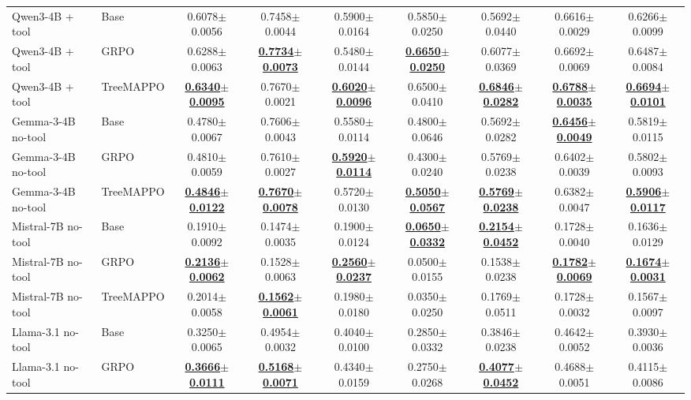 \documentclass{article}
\newcommand{\ours}{TreeMAPPO\xspace}
\newcommand{\best}[1]{\textbf{\underline{#1}}}
\newcommand{\acc}[2]{#1{\scriptsize$\pm$#2}}
\begin{document}
\begin{table}[t]
{\begin{tabular}{llccccccc}
\hline
Qwen3-4B + tool & Base & \acc{0.6078}{0.0056} & \acc{0.7458}{0.0044} & \acc{0.5900}{0.0164} & \acc{0.5850}{0.0250} & \acc{0.5692}{0.0440} & \acc{0.6616}{0.0029} & \acc{0.6266}{0.0099} \\
Qwen3-4B + tool & GRPO & \acc{0.6288}{0.0063} & \best{\acc{0.7734}{0.0073}} & \acc{0.5480}{0.0144} & \best{\acc{0.6650}{0.0250}} & \acc{0.6077}{0.0369} & \acc{0.6692}{0.0069} & \acc{0.6487}{0.0084} \\
Qwen3-4B + tool & \ours & \best{\acc{0.6340}{0.0095}} & \acc{0.7670}{0.0021} & \best{\acc{0.6020}{0.0096}} & \acc{0.6500}{0.0410} & \best{\acc{0.6846}{0.0282}} & \best{\acc{0.6788}{0.0035}} & \best{\acc{0.6694}{0.0101}} \\
\hline
Gemma-3-4B no-tool & Base & \acc{0.4780}{0.0067} & \acc{0.7606}{0.0043} & \acc{0.5580}{0.0114} & \acc{0.4800}{0.0646} & \acc{0.5692}{0.0282} & \best{\acc{0.6456}{0.0049}} & \acc{0.5819}{0.0115} \\
Gemma-3-4B no-tool & GRPO & \acc{0.4810}{0.0059} & \acc{0.7610}{0.0027} & \best{\acc{0.5920}{0.0114}} & \acc{0.4300}{0.0240} & \acc{0.5769}{0.0238} & \acc{0.6402}{0.0039} & \acc{0.5802}{0.0093} \\
Gemma-3-4B no-tool & \ours & \best{\acc{0.4846}{0.0122}} & \best{\acc{0.7670}{0.0078}} & \acc{0.5720}{0.0130} & \best{\acc{0.5050}{0.0567}} & \best{\acc{0.5769}{0.0238}} & \acc{0.6382}{0.0047} & \best{\acc{0.5906}{0.0117}} \\
\hline
Mistral-7B no-tool & Base & \acc{0.1910}{0.0092} & \acc{0.1474}{0.0035} & \acc{0.1900}{0.0124} & \best{\acc{0.0650}{0.0332}} & \best{\acc{0.2154}{0.0452}} & \acc{0.1728}{0.0040} & \acc{0.1636}{0.0129} \\
Mistral-7B no-tool & GRPO & \best{\acc{0.2136}{0.0062}} & \acc{0.1528}{0.0063} & \best{\acc{0.2560}{0.0237}} & \acc{0.0500}{0.0155} & \acc{0.1538}{0.0238} & \best{\acc{0.1782}{0.0069}} & \best{\acc{0.1674}{0.0031}} \\
Mistral-7B no-tool & \ours & \acc{0.2014}{0.0058} & \best{\acc{0.1562}{0.0061}} & \acc{0.1980}{0.0180} & \acc{0.0350}{0.0250} & \acc{0.1769}{0.0511} & \acc{0.1728}{0.0032} & \acc{0.1567}{0.0097} \\
\hline
Llama-3.1 no-tool & Base & \acc{0.3250}{0.0065} & \acc{0.4954}{0.0032} & \acc{0.4040}{0.0100} & \acc{0.2850}{0.0332} & \acc{0.3846}{0.0238} & \acc{0.4642}{0.0052} & \acc{0.3930}{0.0036} \\
Llama-3.1 no-tool & GRPO & \best{\acc{0.3666}{0.0111}} & \best{\acc{0.5168}{0.0071}} & \acc{0.4340}{0.0159} & \acc{0.2750}{0.0268} & \best{\acc{0.4077}{0.0452}} & \acc{0.4688}{0.0051} & \acc{0.4115}{0.0086} \\

\end{tabular}}
\end{table}
\end{document}
